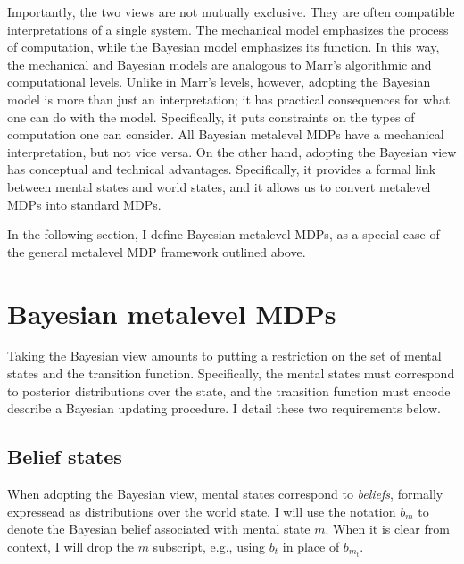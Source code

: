 Importantly, the two views are not mutually exclusive. They are often compatible interpretations of a single system. The mechanical model emphasizes the process of computation, while the Bayesian model emphasizes its function. In this way, the mechanical and Bayesian models are analogous to Marr's algorithmic and computational levels. Unlike in Marr's levels, however, adopting the Bayesian model is more than just an interpretation; it has practical consequences for what one can do with the model. Specifically, it puts constraints on the types of computation one can consider. All Bayesian metalevel MDPs have a mechanical interpretation, but not vice versa. On the other hand, adopting the Bayesian view has conceptual and technical advantages. Specifically, it provides a formal link between mental states and world states, and it allows us to convert metalevel MDPs into standard MDPs.

In the following section, I define Bayesian metalevel MDPs, as a special case of the general metalevel MDP framework outlined above.

\section{Bayesian metalevel MDPs}

Taking the Bayesian view amounts to putting a restriction on the set of mental states and the transition function. Specifically, the mental states must correspond to posterior distributions over the state, and the transition function must encode describe a Bayesian updating procedure. I detail these two requirements below.


\subsection{Belief states}

When adopting the Bayesian view, mental states correspond to \emph{beliefs}, formally expressead as distributions over the world state. I will use the notation $b_m$ to denote the Bayesian belief associated with mental state $m$. When it is clear from context, I will drop the $m$ subscript, e.g., using $b_t$ in place of $b_{m_t}$. 

